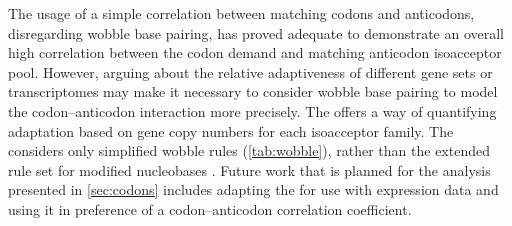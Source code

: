 The usage of a simple correlation between matching codons and anticodons,
disregarding wobble base pairing, has proved adequate to demonstrate an overall
high correlation between the codon demand and matching \trna anticodon
isoacceptor pool. However, arguing about the relative adaptiveness of different
gene sets or transcriptomes may make it  necessary to consider wobble base
pairing to model the codon--anticodon interaction more precisely. The \tai
\citep{Dos_Reis:2003} offers a way of quantifying \trna adaptation based on
\trna gene copy numbers for each isoacceptor family. The \tai considers only
simplified wobble rules (\cref{tab:wobble}), rather than the extended rule set
for modified nucleobases \citep{Murphy:2004}. Future work that is planned for
the analysis presented in \cref{sec:codons} includes adapting the \tai for use
with \trna expression data and using it in preference of a codon--anticodon
correlation coefficient.
